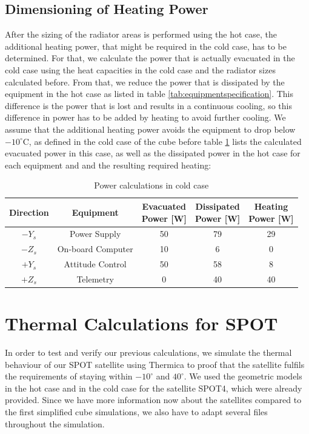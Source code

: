 \subsection{Dimensioning of Heating Power}
After the sizing of the radiator areas is performed using the hot case, the additional heating power, that might be required in the cold case, has to be determined. For that, we calculate the power that is actually evacuated in the cold case using the heat capacities in the cold case and the radiator sizes calculated before. From that, we reduce the power that is dissipated by the equipment in the hot case as listed in table \ref{tab:equipmentspecification}. This difference is the power that is lost and results in a continuous cooling, so this difference in power has to be added by heating to avoid further cooling. We assume that the additional heating power avoids the equipment to drop below $-10^{\circ}$C, as defined in the cold case of the cube before table \ref{tab:powerlisted} lists the calculated evacuated power in this case, as well as the dissipated power in the hot case for each equipment and and the resulting required heating:


\begin{table}[H]
\centering
\begin{tabular}{ | c| c| c| c|c|}
\hline 
Direction& Equipment  & \specialcell{Evacuated \\ Power [W]} & \specialcell{Dissipated\\Power [W]} & \specialcell{Heating \\ Power [W]} \\ \hline
$-Y_{s}$ & Power Supply &  50 & 79 & 29    \\ \hline
$-Z_{s}$ &On-board Computer &10 &6 &  0  \\\hline
$+Y_{s}$ &Attitude Control & 50 & 58 & 8  \\ \hline
$+Z_{s}$ &Telemetry  &  0   & 40 & 40 \\ \hline
\end{tabular}
\caption{Power calculations in cold case}
\label{tab:powerlisted}
\end{table}

\section{Thermal Calculations for SPOT}
In order to test and verify our previous calculations, we simulate the thermal behaviour of our SPOT satellite using Thermica to proof that the satellite fulfils the requirements of staying within $-10^{\circ}$ and $40^{\circ}$. We used the geometric models in the hot case and in the cold case for the satellite SPOT4,  which were already provided. Since we have more information now about the satellites compared to the first simplified cube simulations, we also have to adapt several files throughout the simulation. 

